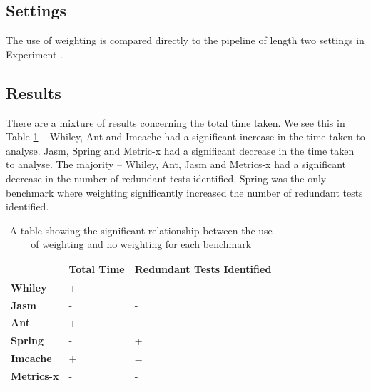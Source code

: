 \subsection{Settings}
The use of weighting is compared directly to the pipeline of length two settings in Experiment .


\subsection{Results}
There are a mixture of results concerning the total time taken. We see this in Table \ref{weightingsig} -- Whiley, Ant and Imcache had a significant increase in the time taken to analyse. Jasm, Spring and Metric-x had a significant decrease in the time taken to analyse. The majority -- Whiley, Ant, Jasm and Metrics-x had a significant decrease in the number of redundant tests identified. Spring was the only benchmark where weighting significantly increased the number of redundant tests identified.

\begin{table}[h]
\centering


\begin{tabular}{|l|l|l|}
\hline
{\bf }          & {\bf Total Time} & {\bf Redundant Tests Identified} \\ \hline
{\bf Whiley}    & +                & -                           \\ \hline
{\bf Jasm}      & -                & -                           \\ \hline
{\bf Ant}       & +                & -                           \\ \hline
{\bf Spring}    & -                & +                           \\ \hline
{\bf Imcache}   & +                & =                           \\ \hline
{\bf Metrics-x} & -                & -                           \\ \hline
\end{tabular}
\caption{A table showing the significant relationship between the use of weighting and no weighting for each benchmark}
\label{weightingsig}
\end{table}


